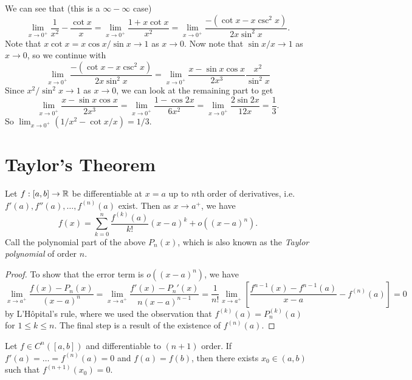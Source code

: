 \begin{example}
  We can see that (this is a $\infty - \infty$ case)
  \[
    \lim_{x \to 0^+} \frac{1}{x^2} - \frac{\cot x}{x}
    = \lim_{x \to 0^+} \frac{1 + x \cot x}{x^2}
    = \lim_{x \to 0^+} \frac{-(\cot x - x \csc^2 x)}{2x \sin^2 x}.
  \]
  Note that $x \cot x = x \cos x / \sin x \to 1$ as
  $x \to 0$. Now note that $\sin x / x \to 1$ as $x \to 0$,
  so we continue with
  \[
    \lim_{x \to 0^+} \frac{-(\cot x - x \csc^2 x)}{2x \sin^2 x}
    = \lim_{x \to 0^+} \frac{x - \sin x \cos x}{2x^3} \frac{x^2}{\sin^2 x}
  \]
  Since $x^2 / \sin^2 x \to 1$ as $x \to 0$, we can
  look at the remaining part to get
  \[
    \lim_{x \to 0^+} \frac{x - \sin x \cos x}{2x^3}
    = \lim_{x \to 0^+} \frac{1 - \cos 2x}{6x^2}
    = \lim_{x \to 0^+} \frac{2 \sin 2x}{12x} = \frac{1}{3}.
  \]
  So $\lim_{x \to 0^+} (1 / x^2 - \cot x / x) = 1 / 3$.
\end{example}

\section{Taylor's Theorem}
\begin{theorem}
  Let $f : [a, b] \to \mathbb{R}$ be differentiable at $x = a$
  up to $n$th order of derivatives, i.e.
  $f'(a), f''(a), \dots, f^{(n)}(a)$ exist. Then as
  $x \to a^+$, we have
  \[f(x) = \sum_{k = 0}^n \frac{f^{(k)}(a)}{k!}(x - a)^k + o((x - a)^n).\]
  Call the polynomial part of the above $P_n(x)$, which
  is also known as the \emph{Taylor polynomial} of order $n$.
\end{theorem}

\begin{proof}
  To show that the error term is $o((x - a)^n)$, we have
  \[
    \lim_{x \to a^+} \frac{f(x) - P_n(x)}{(x - a)^n}
    = \lim_{x \to a^+} \frac{f'(x) - P_n'(x)}{n(x - a)^{n - 1}}
    = \frac{1}{n!} \lim_{x \to a^+} \left[\frac{f^{n - 1}(x) - f^{n - 1}(a)}{x - a} - f^{(n)}(a)\right] = 0
  \]
  by L'H\^opital's rule, where we used the observation
  that
  $f^{(k)}(a) = P_n^{(k)}(a)$ for $1 \le k \le n$.
  The final step is a result of the existence of $f^{(n)}(a)$.
\end{proof}

\begin{lemma}
  Let $f \in C^n([a, b])$ and differentiable to
  $(n + 1)$ order. If $f'(a) = \dots = f^{(n)}(a) = 0$
  and $f(a) = f(b)$, then there exists $x_0 \in (a, b)$
  such that $f^{(n + 1)}(x_0) = 0$.
\end{lemma}

